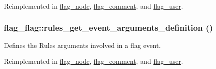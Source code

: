 Reimplemented in \hyperlink{classflag__node_cb9a883b4910f72b836875066fc31c2c}{flag\_\-node}, \hyperlink{classflag__comment_7b1d6ccaef3c1405005f8ff35878b2e2}{flag\_\-comment}, and \hyperlink{classflag__user_7ff3a7690719f97b18be24006586f083}{flag\_\-user}.\hypertarget{group__rules_g21a07dbe1a9e496438d235e95e67c048}{
\subsubsection[{rules\_\-get\_\-event\_\-arguments\_\-definition}]{\setlength{\rightskip}{0pt plus 5cm}flag\_\-flag::rules\_\-get\_\-event\_\-arguments\_\-definition ()}}
\label{group__rules_g21a07dbe1a9e496438d235e95e67c048}


Defines the Rules arguments involved in a flag event. 

Reimplemented in \hyperlink{classflag__node_eecfa8b26fc30aaafc376e92f6a2c00b}{flag\_\-node}, \hyperlink{classflag__comment_59dfcb8d0b77553cae330b3efb0beada}{flag\_\-comment}, and \hyperlink{classflag__user_1773406a095155a3a1f6f8c0f099b85a}{flag\_\-user}.